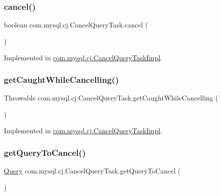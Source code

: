 \subsubsection{\texorpdfstring{cancel()}{cancel()}}
{\footnotesize\ttfamily boolean com.\+mysql.\+cj.\+Cancel\+Query\+Task.\+cancel (\begin{DoxyParamCaption}{ }\end{DoxyParamCaption})}



Implemented in \mbox{\hyperlink{classcom_1_1mysql_1_1cj_1_1_cancel_query_task_impl_aa279eeabcc803503e806f552ee3fd46a}{com.\+mysql.\+cj.\+Cancel\+Query\+Task\+Impl}}.

\mbox{\label{interfacecom_1_1mysql_1_1cj_1_1_cancel_query_task_a034f915ab5a54b244d44e462421d7036}} 
\subsubsection{\texorpdfstring{get\+Caught\+While\+Cancelling()}{getCaughtWhileCancelling()}}
{\footnotesize\ttfamily Throwable com.\+mysql.\+cj.\+Cancel\+Query\+Task.\+get\+Caught\+While\+Cancelling (\begin{DoxyParamCaption}{ }\end{DoxyParamCaption})}



Implemented in \mbox{\hyperlink{classcom_1_1mysql_1_1cj_1_1_cancel_query_task_impl_a15fc1cf4ae9eaf9fdaa427bae226b210}{com.\+mysql.\+cj.\+Cancel\+Query\+Task\+Impl}}.

\mbox{\label{interfacecom_1_1mysql_1_1cj_1_1_cancel_query_task_a676c3131b684b869e322954254116b87}} 
\subsubsection{\texorpdfstring{get\+Query\+To\+Cancel()}{getQueryToCancel()}}
{\footnotesize\ttfamily \mbox{\hyperlink{interfacecom_1_1mysql_1_1cj_1_1_query}{Query}} com.\+mysql.\+cj.\+Cancel\+Query\+Task.\+get\+Query\+To\+Cancel (\begin{DoxyParamCaption}{ }\end{DoxyParamCaption})}



